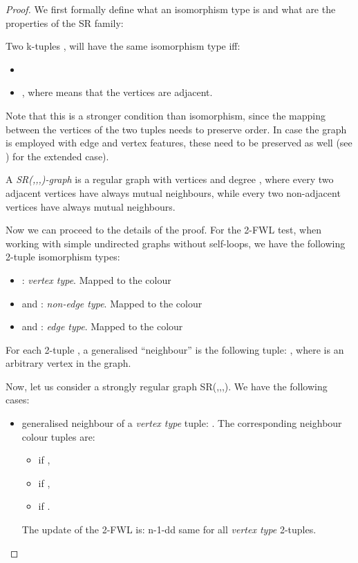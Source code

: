 \begin{proof}

We first formally define what an isomorphism type is and what are the properties of the SR family:

\begin{definition} 
Two k-tuples , 
 will have the same isomorphism type iff:

\begin{itemize}
    \item  
    \item  , where  means that the vertices are adjacent.
\end{itemize}
\end{definition}

Note that this is a stronger condition than isomorphism, since the mapping between the vertices of the two tuples needs to preserve order. In case the graph is employed with edge and vertex features, these need to be preserved as well (see \cite{chen2020can}) for the extended case). 

\begin{definition} 
A {\em SR(,,,)-graph} is a regular graph with  vertices and degree , where every two adjacent vertices have always  mutual neighbours, while every two non-adjacent vertices have always  mutual neighbours. 
\end{definition}


Now we can proceed to the details of the proof. For the 2-FWL test, when working with simple undirected graphs without self-loops, we have the following 2-tuple isomorphism types:
\begin{itemize}
    \item : \textit{vertex type}. Mapped to the colour 
    \item  and :\textit{ non-edge type}. Mapped to the colour 
    \item  and : \textit{edge type}. Mapped to the colour 
\end{itemize}
 
 For each 2-tuple , a generalised ``neighbour'' is the following tuple: , where  is an arbitrary vertex in the graph. 

Now, let us consider a strongly regular graph SR(,,,). We have the following cases:

\begin{itemize}
    \item generalised neighbour of a  \textit{vertex type} tuple: . The corresponding neighbour colour tuples are:
    \begin{itemize}
        \item   if  ,
        \item  if  ,
        \item  if .
    \end{itemize}
    The update of the 2-FWL is: n-1-dd same for all \textit{vertex type} 2-tuples.
    

\end{itemize}
\end{proof}
